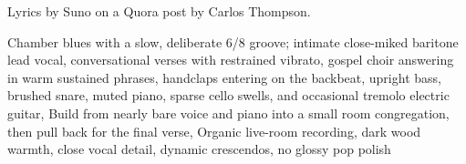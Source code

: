 
\begin{notes}
Lyrics by Suno on a Quora post by Carlos Thompson.
\end{notes}
\begin{style}
Chamber blues with a slow, deliberate 6/8 groove; intimate close-miked baritone lead vocal, conversational verses with restrained vibrato, gospel choir answering in warm sustained phrases, handclaps entering on the backbeat, upright bass, brushed snare, muted piano, sparse cello swells, and occasional tremolo electric guitar, Build from nearly bare voice and piano into a small room congregation, then pull back for the final verse, Organic live-room recording, dark wood warmth, close vocal detail, dynamic crescendos, no glossy pop polish
\end{style}
